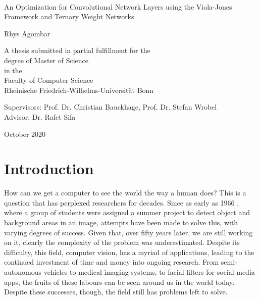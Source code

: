 \documentclass[11pt,a4paper,oldfontcommands]{memoir}
\begin{document}
%
%
\thispagestyle{empty}

{%
\sffamily
\centering
\Large

~\vspace{\fill}

{\huge 
An Optimization for Convolutional Network Layers using the Viola-Jones Framework and Ternary Weight Networks
}

\vspace{2.5cm}

{\LARGE
Rhys Agombar
}

\vspace{3.5cm}

A thesis submitted in partial fulfillment for the\\
degree of Master of Science\\[1em]
in the\\[1em]
Faculty of Computer Science\\
Rheinische Friedrich-Wilhelms-Universität Bonn

\vspace{3.5cm}

Supervisors: Prof. Dr. Christian Bauckhage, Prof. Dr. Stefan Wrobel \\
Advisor: Dr. Rafet Sifa

\vspace{\fill}

October 2020
}%

\cleardoublepage%
\tableofcontents*


\chapter{Introduction}
How can we get a computer to see the world the way a human does? This is a question that has perplexed researchers for decades. Since as early as 1966 \cite{mit_cv}, where a group of students were assigned a summer project to detect object and background areas in an image, attempts have been made to solve this, with varying degrees of success. Given that, over fifty years later, we are still working on it, clearly the complexity of the problem was underestimated. Despite its difficulty, this field, computer vision, has a myriad of applications, leading to the continued investment of time and money into ongoing research. From semi-autonomous vehicles to medical imaging systems, to facial filters for social media apps, the fruits of these labours can be seen around us in the world today. Despite these successes, though, the field still has problems left to solve.
\end{document}
